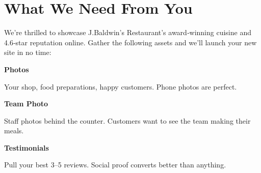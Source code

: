 \documentclass[11pt,letterpaper]{article}
\begin{document}
\vspace{0.2em}

\section*{What We Need From You}

We’re thrilled to showcase J.Baldwin's Restaurant’s award‑winning cuisine and 4.6‑star reputation online. Gather the following assets and we’ll launch your new site in no time:

\vspace{0.12em}

\noindent\begin{minipage}[t]{0.48\textwidth}
\begin{tcolorbox}[colframe=accent-teal, boxrule=1pt, left=0.7em, right=0.7em, top=0.5em, bottom=0.5em, arc=4pt, boxsep=0pt]
{\bfseries\small\color{accent-teal}Photos}

\vspace{0.15em}

{\small Your shop, food preparations, happy customers. Phone photos are perfect.}
\end{tcolorbox}

\vspace{0.1em}

\begin{tcolorbox}[colframe=accent-teal, boxrule=1pt, left=0.7em, right=0.7em, top=0.5em, bottom=0.5em, arc=4pt, boxsep=0pt]
{\bfseries\small\color{accent-teal}Team Photo}

\vspace{0.15em}

{\small Staff photos behind the counter. Customers want to see the team making their meals.}
\end{tcolorbox}

\vspace{0.1em}

\begin{tcolorbox}[colframe=accent-teal, boxrule=1pt, left=0.7em, right=0.7em, top=0.5em, bottom=0.5em, arc=4pt, boxsep=0pt]
{\bfseries\small\color{accent-teal}Testimonials}

\vspace{0.15em}

{\small Pull your best 3--5 reviews. Social proof converts better than anything.}
\end{tcolorbox}
\end{minipage}
\hfill
\end{document}
